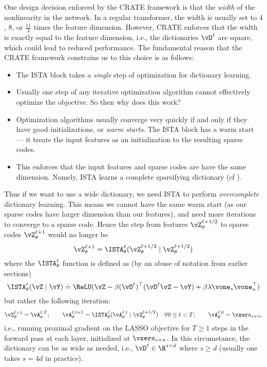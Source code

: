 \documentclass[../../book-main.tex]{subfiles}
\begin{document}
One design decision enforced by the CRATE framework is that the \textit{width} of the nonlinearity in the network. In a regular transformer, the width is usually set to \(4\), \(8\), or \(\frac{11}{3}\) times the feature dimension. However, CRATE enforces that the width is exactly equal to the feature dimension, i.e., the dictionaries \(\vD^{\ell}\) are square, which could lead to reduced performance. The fundamental reason that the CRATE framework constrains us to this choice is as follows:
\begin{itemize}
    \item The ISTA block takes a \textit{single} step of optimization for dictionary learning.
    \item Usually one step of any iterative optimization algorithm cannot effectively optimize the objective. So then why does this work?
    \item Optimization algorithms usually converge very quickly if and only if they have good initializations, or \textit{warm starts}. The ISTA block has a warm start --- it treats the input features as an initialization to the resulting sparse codes.
    \item This enforces that the input features and sparse codes are have the same dimension. Namely, ISTA learns a complete sparsifying dictionary (cf ).
\end{itemize}
Thus if we want to use a wide dictionary, we need ISTA to perform \textit{overcomplete} dictionary learning. This means we cannot have the same warm start (as our sparse codes have larger dimension than our features), and need more iterations to converge to a sparse code. Hence the step from features \(\vZ_{\theta}^{\ell + 1/2}\) to sparse codes \(\vZ_{\theta}^{\ell + 1}\) would no longer be 
\begin{equation}
    \vZ_{\theta}^{\ell + 1} = \ISTA_{\theta}^{\ell}(\vZ_{\theta}^{\ell + 1/2} \mid \vZ_{\theta}^{\ell + 1/2})
\end{equation}
where the \(\ISTA_{\theta}^{\ell}\) function is defined as (by an abuse of notation from earlier sections)
\begin{equation}
    \ISTA_{\theta}^{\ell}(\vZ \mid \vY) \doteq \ReLU(\vZ - \beta (\vD^{\ell})^{\top}(\vD^{\ell}\vZ - \vY) + \beta \lambda \vone_{s}\vone_{n}^{\top})
\end{equation}
but rather the following iteration:
\begin{equation}
    \vZ_{\theta}^{\ell + 1} = \vA_{\theta}^{\ell, T}; \qquad \vA_{\theta}^{\ell, t + 1} = \ISTA_{\theta}^{\ell}(\vA_{\theta}^{\ell, t} \mid \vZ_{\theta}^{\ell + 1/2}) \quad \forall 0 \leq t < T; \qquad \vA_{\theta}^{\ell, 0} = \vzero_{s \times n},
\end{equation}
i.e., running proximal gradient on the LASSO objective for \(T \geq 1\) steps in the forward pass at each layer, initialized at \(\vzero_{s \times n}\). In this circumstance, the dictionary can be as wide as needed, i.e., \(\vD^{\ell} \in \R^{s \times d}\) where \(s \geq d\) (usually one takes \(s = 4d\) in practice). 
\end{document}
